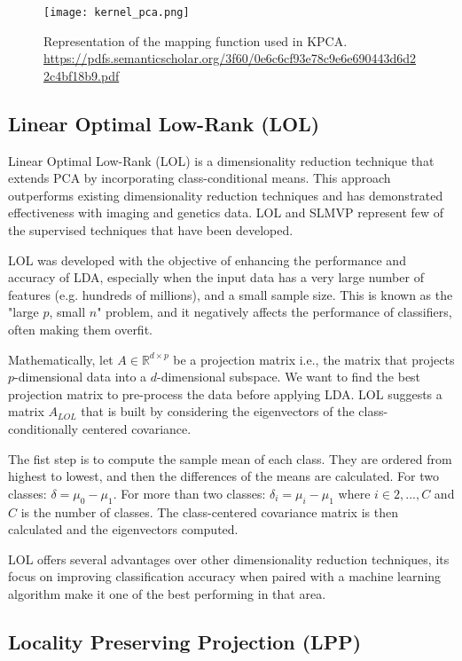 \begin{figure}
    \centering
    \texttt{[image: kernel\_pca.png]}
    \caption{Representation of the mapping function used in KPCA. \url{https://pdfs.semanticscholar.org/3f60/0e6c6cf93e78c9e6e690443d6d22c4bf18b9.pdf}}
    \label{fig:kernel_pca}
\end{figure}

\subsection{Linear Optimal Low-Rank (LOL)}

Linear Optimal Low-Rank (LOL) is a dimensionality reduction technique that extends PCA by incorporating class-conditional means. This approach outperforms existing dimensionality reduction techniques and has demonstrated effectiveness with imaging and genetics data. LOL and SLMVP represent few of the supervised techniques that have been developed.

LOL was developed with the objective of enhancing the performance and accuracy of LDA, especially when the input data has a very large number of features (e.g. hundreds of millions), and a small sample size. This is known as the "large $p$, small $n$" problem, and it negatively affects the performance of classifiers, often making them overfit.

Mathematically, let $A \in \mathbb{R}^{d \times p}$ be a projection matrix i.e., the matrix that projects $p$-dimensional data into a $d$-dimensional subspace. We want to find the best projection matrix to pre-process the data before applying LDA. LOL suggests a matrix $A_{LOL}$ that is built by considering the eigenvectors of the class-conditionally centered covariance.

The fist step is to compute the sample mean of each class. They are ordered from highest to lowest, and then the differences of the means are calculated. For two classes: $\delta = \mu_0 - \mu_1$. For more than two classes: $\delta_i = \mu_i - \mu_1$ where $i \in {2,...,C}$ and $C$ is the number of classes. The class-centered covariance matrix is then calculated and the eigenvectors computed.

LOL offers several advantages over other dimensionality reduction techniques, its focus on improving classification accuracy when paired with a machine learning algorithm make it one of the best performing in that area.

\subsection{Locality Preserving Projection (LPP)}

